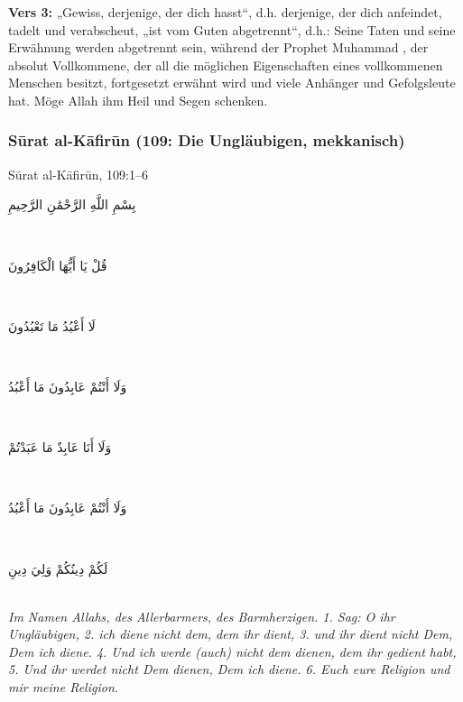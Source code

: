 \textbf{Vers 3:} „Gewiss, derjenige, der dich hasst“, d.h. derjenige, der dich anfeindet, tadelt und
verabscheut, „ist vom Guten abgetrennt“, d.h.: Seine Taten und seine Erwähnung werden
abgetrennt sein, während der Prophet Muhammad , der absolut Vollkommene, der all die
möglichen Eigenschaften eines vollkommenen Menschen besitzt, fortgesetzt erwähnt wird und
viele Anhänger und Gefolgsleute hat. Möge Allah ihm Heil und Segen schenken.

\subsubsection*{Sūrat al-Kāfirūn (109: Die Ungläubigen, mekkanisch)}

\begin{quranvers}{Sūrat al-Kāfirūn, 109:1--6}
{\quranfont\begin{Arabic}
بِسْمِ اللَّهِ الرَّحْمَٰنِ الرَّحِيمِ
\end{Arabic}}\\[2mm]
{\quranfont\begin{Arabic}
قُلْ يَا أَيُّهَا الْكَافِرُونَ
\end{Arabic}}\\[2mm]
{\quranfont\begin{Arabic}
لَا أَعْبُدُ مَا تَعْبُدُونَ
\end{Arabic}}\\[2mm]
{\quranfont\begin{Arabic}
وَلَا أَنْتُمْ عَابِدُونَ مَا أَعْبُدُ
\end{Arabic}}\\[2mm]
{\quranfont\begin{Arabic}
وَلَا أَنَا عَابِدٌ مَا عَبَدْتُمْ
\end{Arabic}}\\[2mm]
{\quranfont\begin{Arabic}
وَلَا أَنْتُمْ عَابِدُونَ مَا أَعْبُدُ
\end{Arabic}}\\[2mm]
{\quranfont\begin{Arabic}
لَكُمْ دِينُكُمْ وَلِيَ دِينِ
\end{Arabic}}\\[3mm]
\emph{Im Namen Allahs, des Allerbarmers, des Barmherzigen. 1. Sag: O ihr Ungläubigen, 2. ich
diene nicht dem, dem ihr dient, 3. und ihr dient nicht Dem, Dem ich diene. 4. Und ich werde
(auch) nicht dem dienen, dem ihr gedient habt, 5. Und ihr werdet nicht Dem dienen, Dem ich
diene. 6. Euch eure Religion und mir meine Religion.}
\end{quranvers}

